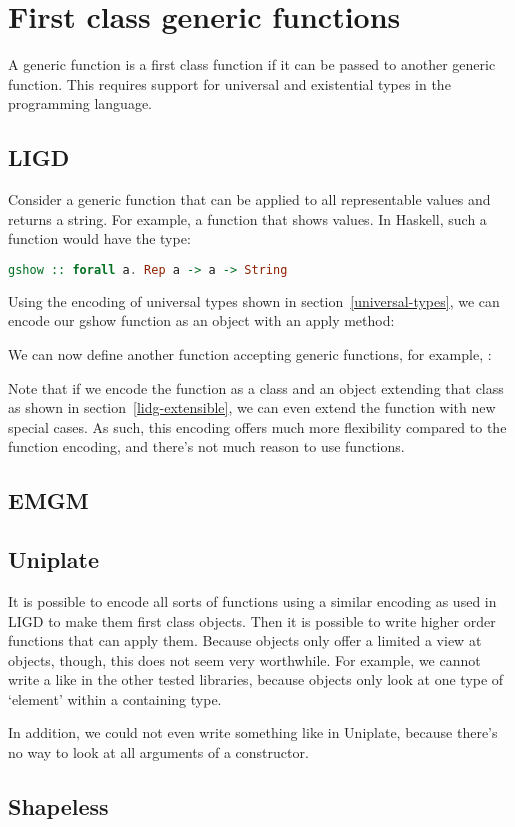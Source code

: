 \section{First class generic functions}

A generic function is a first class function if it can be passed to another
generic function. This requires support for universal and existential types in the programming
language.

\subsection{LIGD}

Consider a generic function that can be applied to all representable values
and returns a string. For example, a function  that shows values.
In Haskell, such a function would have the type:
\begin{lstlisting}[language=Haskell]
gshow :: forall a. Rep a -> a -> String
\end{lstlisting}

Using the encoding of universal types shown in section~\ref{universal-types},
we can encode our gshow function as an object with an apply method:

We can now define another function accepting generic functions, for example, :


Note that if we encode the function as a class and an object extending that
class as shown in section~\ref{lidg-extensible}, we can even extend the
function with new special cases. As such, this encoding offers much more
flexibility compared to the function encoding, and there's not much reason
to use functions.

\subsection{EMGM}

\subsection{Uniplate}
It is possible to encode all sorts of functions using a similar encoding
as used in LIGD to make them first class objects. Then it is possible to write
higher order functions that can apply them. Because  objects only offer
a limited a view at objects, though, this does not seem very worthwhile. For
example, we cannot write a  like in the other tested libraries, because
 objects only look at one type of `element' within a containing
type.

In addition, we could not even write something like  in Uniplate,
because there's no way to look at all arguments of a constructor.


\subsection{Shapeless}
